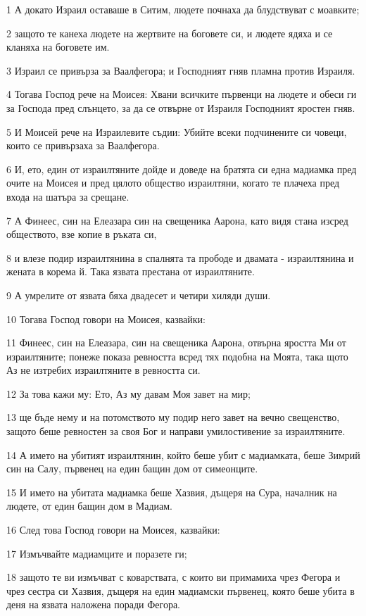 \par 1 А докато Израил оставаше в Ситим, людете почнаха да блудствуват с моавките;
\par 2 защото те канеха людете на жертвите на боговете си, и людете ядяха и се кланяха на боговете им.
\par 3 Израил се привърза за Ваалфегора; и Господният гняв пламна против Израиля.
\par 4 Тогава Господ рече на Моисея: Хвани всичките първенци на людете и обеси ги за Господа пред слънцето, за да се отвърне от Израиля Господният яростен гняв.
\par 5 И Моисей рече на Израилевите съдии: Убийте всеки подчинените си човеци, които се привързаха за Ваалфегора.
\par 6 И, ето, един от израилтяните дойде и доведе на братята си една мадиамка пред очите на Моисея и пред цялото общество израилтяни, когато те плачеха пред входа на шатъра за срещане.
\par 7 А Финеес, син на Елеазара син на свещеника Аарона, като видя стана изсред обществото, взе копие в ръката си,
\par 8 и влезе подир израилтянина в спалнята та прободе и двамата - израилтянина и жената в корема й. Така язвата престана от израилтяните.
\par 9 А умрелите от язвата бяха двадесет и четири хиляди души.
\par 10 Тогава Господ говори на Моисея, казвайки:
\par 11 Финеес, син на Елеазара, син на свещеника Аарона, отвърна яростта Ми от израилтяните; понеже показа ревността всред тях подобна на Моята, така щото Аз не изтребих израилтяните в ревността си.
\par 12 За това кажи му: Ето, Аз му давам Моя завет на мир;
\par 13 ще бъде нему и на потомството му подир него завет на вечно свещенство, защото беше ревностен за своя Бог и направи умилостивение за израилтяните.
\par 14 А името на убитият израилтянин, който беше убит с мадиамката, беше Зимрий син на Салу, първенец на един бащин дом от симеонците.
\par 15 И името на убитата мадиамка беше Хазвия, дъщеря на Сура, началник на людете, от един бащин дом в Мадиам.
\par 16 След това Господ говори на Моисея, казвайки:
\par 17 Измъчвайте мадиамците и поразете ги;
\par 18 защото те ви измъчват с коварствата, с които ви примамиха чрез Фегора и чрез сестра си Хазвия, дъщеря на един мадиамски първенец, която беше убита в деня на язвата наложена поради Фегора.

